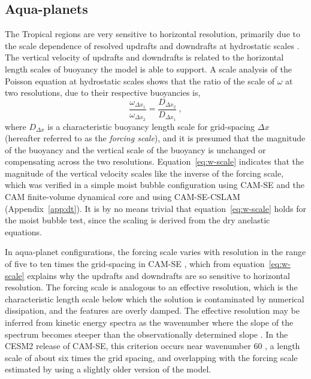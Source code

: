 \documentclass{agujournal}
\begin{document}
\subsection{Aqua-planets}\label{sec:aquaplanet}

The Tropical regions are very sensitive to horizontal resolution, primarily due to the scale dependence of resolved updrafts and downdrafts at hydrostatic scales \citep{HR2017JCLIM,HR2018JAMES}. The vertical velocity of updrafts and downdrafts is related to the horizontal length scales of buoyancy the model is able to support. A scale analysis of the Poisson equation \citep{JR2016QJRMS} at hydrostatic scales shows that the ratio of the scale of $\omega$ at two resolutions, due to their respective buoyancies is,
\begin{equation}
\frac{\omega_{\Delta x_1}}{\omega_{\Delta x_2}} =  \frac{D_{\Delta x_2}}{D_{\Delta x_1}}~,\label{eq:w-scale}
\end{equation}
where $D_{\Delta x}$ is a characteristic buoyancy length scale for grid-spacing $\Delta x$ (hereafter referred to as the {\em{forcing scale}}), and it is presumed that the magnitude of the buoyancy and the vertical scale of the buoyancy is unchanged or compensating across the two resolutions. Equation~\ref{eq:w-scale} indicates that the magnitude of the vertical velocity scales like the inverse of the forcing scale, which was verified in a simple moist bubble configuration using CAM-SE and the CAM finite-volume dynamical core \citep[CAM-FV;][]{HR2018JAMES} and using CAM-SE-CSLAM (Appendix~\ref{app:dt}). It is by no means trivial that equation~\ref{eq:w-scale} holds for the moist bubble test, since the scaling is derived from the dry anelastic equations.

In aqua-planet configurations, the forcing scale varies with resolution in the range of five to ten times the grid-spacing in CAM-SE \citep{HR2018JAMES}, which from equation~\ref{eq:w-scale} explains why the updrafts and downdrafts are so sensitive to horizontal resolution. The forcing scale is analogous to an effective resolution, which is the characteristic length scale below which the solution is contaminated by numerical dissipation, and the features are overly damped. The effective resolution may be inferred from kinetic energy spectra as the wavenumber where the slope of the spectrum becomes steeper than the observationally determined slope \citep{S2011LNCSE}. In the CESM2 release of CAM-SE, this criterion occurs near wavenumber 60 \citep[see Figure 6 in][]{LetAl2018JAMES}, a length scale of about six times the grid spacing, and overlapping with the forcing scale estimated by \citep{HR2018JAMES} using a slightly older version of the model.
\end{document}

